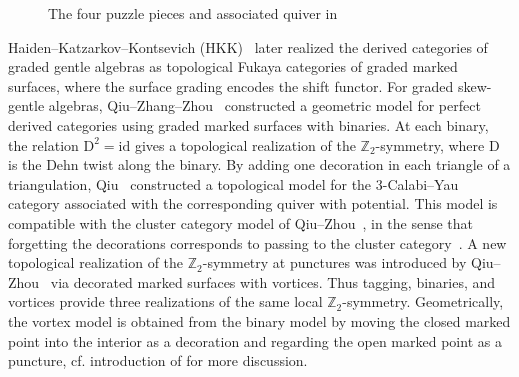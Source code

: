 \documentclass[11pt,a4paper,reqno]{amsart}%
\theoremstyle{plain}
\theoremstyle{definition}
\numberwithin{equation}{section}
\numberwithin{equation}{section}
\begin{document}
\begin{figure}[htbp]
{
}
\caption{The four puzzle pieces and associated quiver in \cite{FST} %
}
\label{fig:fst-puzzle-pieces}
\end{figure}  
Haiden--Katzarkov--Kontsevich (HKK)~\cite{HKK} later realized the derived categories of graded gentle algebras as topological Fukaya categories of graded  marked surfaces, where the surface grading encodes the shift functor.
For graded skew-gentle algebras, Qiu--Zhang--Zhou~\cite{QZZ} constructed a geometric model for perfect derived categories using graded marked surfaces with binaries.
 At each binary, the relation $\mathrm{D}^2=\mathrm{id}$ gives a topological realization of the $\mathbb{Z}_2$-symmetry, where $\mathrm{D}$ is the Dehn twist along the binary. By adding one decoration in each triangle of a triangulation, Qiu~\cite{QQ,QiuB} constructed a topological model for the $3$-Calabi--Yau category associated with the corresponding quiver with potential. This model is compatible with the cluster category model of Qiu--Zhou~\cite{QZ1}, in the sense that forgetting the decorations corresponds to passing to the cluster category~\cite{QiuB}. A new topological realization of the $\mathbb{Z}_2$-symmetry at punctures was introduced by Qiu--Zhou~\cite{QZ3} via decorated marked surfaces with vortices. Thus tagging, binaries, and vortices provide three realizations of the same local $\mathbb{Z}_2$-symmetry. Geometrically, the vortex model is obtained from the binary model by moving the closed marked point into the interior as a decoration and regarding the open marked point as a puncture, cf. introduction of \cite{QZ3} for more discussion.
\end{document}
